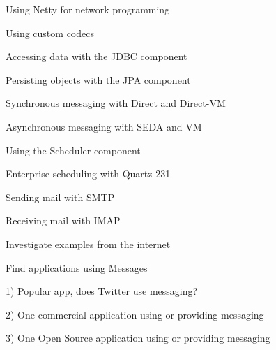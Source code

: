 \documentclass[Screen16to9,17pt]{foils}
\begin{document}

\begin{list2}
\item Using Netty for network programming
\item Using custom codecs
\end{list2}



\begin{list2}
\item Accessing data with the JDBC component
\item Persisting objects with the JPA component
\end{list2}




\begin{list2}
\item Synchronous messaging with Direct and Direct-­VM
\item Asynchronous messaging with SEDA and VM
\end{list2}


\begin{list2}
\item Using the Scheduler component
\item Enterprise scheduling with Quartz 231
\end{list2}


\begin{list2}
\item Sending mail with SMTP
\item  Receiving mail with IMAP
\end{list2}


\slide{}

Investigate examples from the internet

Find applications using Messages

1) Popular app, does Twitter use messaging?

2) One commercial application using or providing messaging

3) One Open Source application using or providing messaging



\slidenext
\end{document}
